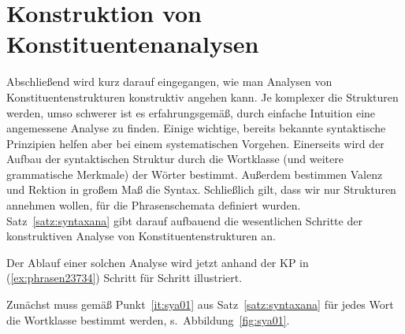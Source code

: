 \section{Konstruktion von Konstituentenanalysen}

\label{sec:syntaxana}

Abschließend wird kurz darauf eingegangen, wie man Analysen von Konstituentenstrukturen konstruktiv angehen kann.
Je komplexer die Strukturen werden, umso schwerer ist es erfahrungsgemäß, durch einfache Intuition eine angemessene Analyse zu finden.
Einige wichtige, bereits bekannte syntaktische Prinzipien helfen aber bei einem systematischen Vorgehen.
Einerseits wird der Aufbau der syntaktischen Struktur durch die Wortklasse (und weitere grammatische Merkmale) der Wörter bestimmt.
Außerdem bestimmen Valenz und Rektion in großem Maß die Syntax.
Schließlich gilt, dass wir nur Strukturen annehmen wollen, für die Phrasenschemata definiert wurden.
Satz~\ref{satz:syntaxana} gibt darauf aufbauend die wesentlichen Schritte der konstruktiven Analyse von Konstituentenstrukturen an.


Der Ablauf einer solchen Analyse wird jetzt anhand der KP in (\ref{ex:phrasen23734}) Schritt für Schritt illustriert.

\begin{exe}
\end{exe}

Zunächst muss gemäß Punkt~\ref{it:sya01} aus Satz~\ref{satz:syntaxana} für jedes Wort die Wortklasse bestimmt werden, s.\ Abbildung~\ref{fig:sya01}.

